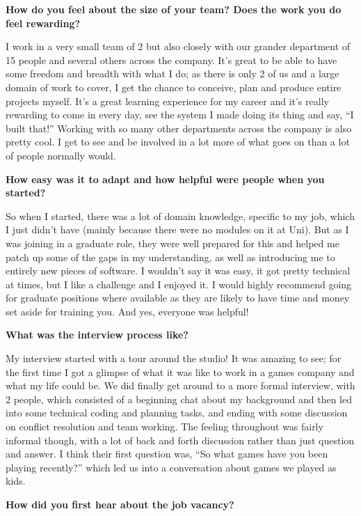 \documentclass{scrartcl}
\begin{document}
\begin{appendices}
\par
\textbf{How do you feel about the size of your team? Does the work you do feel rewarding?}
\par
I work in a very small team of 2 but also closely with our grander department of 15 people and several others across the company. It’s great to be able to have some freedom and breadth with what I do; as there is only 2 of us and a large domain of work to cover, I get the chance to conceive, plan and produce entire projects myself. It’s a great learning experience for my career and it’s really rewarding to come in every day, see the system I made doing its thing and say, “I built that!”
Working with so many other departments across the company is also pretty cool. I get to see and be involved in a lot more of what goes on than a lot of people normally would. 
\par
\textbf{How easy was it to adapt and how helpful were people when you started?}
\par
So when I started, there was a lot of domain knowledge, specific to my job, which I just didn’t have (mainly because there were no modules on it at Uni). But as I was joining in a graduate role, they were well prepared for this and helped me patch up some of the gaps in my understanding, as well as introducing me to entirely new pieces of software. I wouldn’t say it was easy, it got pretty technical at times, but I like a challenge and I enjoyed it. I would highly recommend going for graduate positions where available as they are likely to have time and money set aside for training you. 
And yes, everyone was helpful!
\par
\textbf{What was the interview process like?}
\par
My interview started with a tour around the studio! It was amazing to see; for the first time I got a glimpse of what it was like to work in a games company and what my life could be. We did finally get around to a more formal interview, with 2 people, which consisted of a beginning chat about my background and then led into some technical coding and planning tasks, and ending with some discussion on conflict resolution and team working. 
The feeling throughout was fairly informal though, with a lot of back and forth discussion rather than just question and answer. I think their first question was, “So what games have you been playing recently?” which led us into a conversation about games we played as kids.
\par
\textbf{How did you first hear about the job vacancy?}
\par

\end{appendices}
\end{document}
